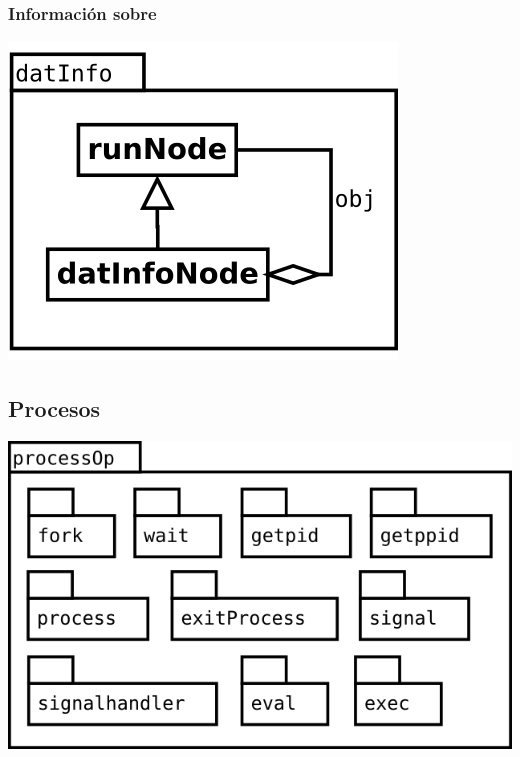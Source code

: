 \subsubsection {Información sobre} 
\begin{center}
\includegraphics[scale=0.4]{datInfo.png} \\
\end{center}

\pagebreak
\subsection {Procesos} 
\begin{center}
\includegraphics[scale=0.4]{processOp-package.png} \\
\end{center}

